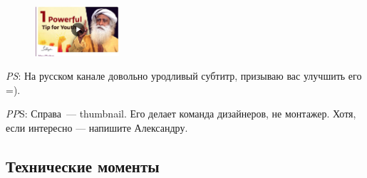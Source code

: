 \documentclass[
a4paper, %
12pt, %
article,
onecolumn, %
openany, %
]{memoir}
\begin{document}
\begin{figure}
  \begin{center}
    \includegraphics[width=0.28\textwidth]{thumbnail}
  \end{center}
\end{figure}

\emph{PS}: На русском канале довольно уродливый субтитр, призываю вас улучшить его =).

\emph{PP}S: Справа~--- thumbnail. Его делает команда дизайнеров, не монтажер.
Хотя, если интересно — напишите Александру.


\newpage
\subsection{Технические моменты}
\end{document}
